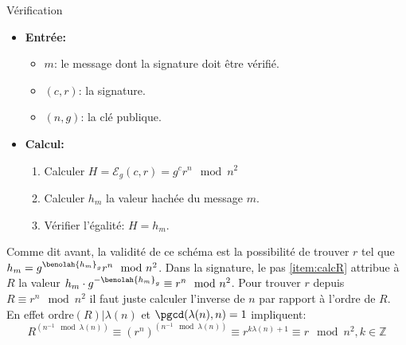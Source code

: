 	\begin{algo}{Vérification}
		\begin{itemize}\renewcommand{\labelitemi}{} \renewcommand{\labelitemii}{$\cdot$}
			\item{\bf Entrée:} 
				\begin{itemize}
					\item $m$: le message dont la signature doit être vérifié.
					\item $(c,r)$: la signature.
					\item $(n,g)$: la clé publique.
				\end{itemize}
			\item{\bf Calcul:}
				\begin{enumerate} %
				\renewcommand{\theenumi}{\arabic{enumi}}
				\renewcommand{\theenumii}{\arabic{enumii}}
				\renewcommand{\theenumiii}{\arabic{enumiii}}
				\renewcommand{\labelenumi}{\theenumi.}
				\renewcommand{\labelenumii}{\theenumi.\theenumii.}
				\renewcommand{\labelenumiii}{\theenumi.\theenumii.\theenumiii.}
				\makeatletter
				\renewcommand{\p@enumii}{\theenumi.}
				\renewcommand{\p@enumiii}{\theenumi.\theenumii.}
				\makeatother

				\item Calculer $H = \mathcal{E}_g(c,r) = g^cr^n\mod{n^2}$
				\item Calculer $h_m$ la valeur hachée du message $m$.
				\item Vérifier l'égalité: $H = h_m$.
				\end{enumerate}

		\end{itemize}
	\end{algo}

	Comme dit avant, la validité de ce schéma est la possibilité de trouver $r$ tel que
	$h_m = g^{\benolah{h_m}_g}r^n\mod{n^2}$. Dans la signature, le pas \ref{item:calcR} attribue à $R$ la valeur
	$h_m\cdot g^{-\benolah{h_m}_g}\equiv r^n\mod{n^2} $. Pour trouver $r$ depuis $R \equiv r^n\mod{n^2} $ il 
	faut juste calculer l'inverse de $n$ par rapport à l'ordre de $R$. En effet $\text{ordre$(R)$}|\lambda(n)$ et   
	$\pgcd(\lambda(n),n) = 1$ impliquent:
		$$R^{(n^{-1}\mod{\lambda(n)})} \equiv (r^n)^{(n^{-1}\mod{\lambda(n)})} \equiv r^{k\lambda(n)+1} \equiv r\mod{n^2}, k\in\mathbb{Z} $$

%

